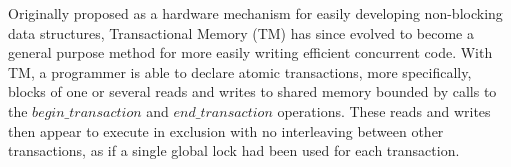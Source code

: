 \documentclass[11pt,letterpaper]{article}
\begin{document}
\newlength {\squarewidth}
\renewenvironment {square}
{
\setlength {\squarewidth} {\linewidth}
\addtolength {\squarewidth} {-12pt}
\renewcommand{\baselinestretch}{0.75} \footnotesize
\begin {center}
\begin {tabular} {|c|} \hline
\begin {minipage} {\squarewidth}
\medskip
}{
\end {minipage}
\\ \hline
\end{tabular}
\end{center}
}  
 
\newtheorem{definition}{Definition}
\newtheorem{theorem}{Theorem}
\newtheorem{lemma}{Lemma}
\newtheorem{corollary}{Corollary}
\newcommand{\toto}{xxx}
\newenvironment{proofT}{\noindent{\bf
Proof }} {\hspace*{\fill}$\Box_{Theorem~\ref{\toto}}$\par\vspace{3mm}}
\newenvironment{proofL}{\noindent{\bf
Proof }} {\hspace*{\fill}$\Box_{Lemma~\ref{\toto}}$\par\vspace{3mm}}
\newenvironment{proofC}{\noindent{\bf
Proof }} {\hspace*{\fill}$\Box_{Corollary~\ref{\toto}}$\par\vspace{3mm}}


\newcommand{\linenumbering}{\ifthenelse{\value{linecounter}<10}
{(0\arabic{linecounter})}{(\arabic{linecounter})}}
\renewcommand{\line}[1]{\refstepcounter{linecounter}\label{#1}\linenumbering}
\newcommand{\resetline}[1]{\setcounter{linecounter}{0}#1}
\renewcommand{\thelinecounter}{\ifnum \value{linecounter} > 
9\else 0\fi \arabic{linecounter}}

\newcommand{\tuple}[1]{\ensuremath{\left \langle #1 \right \rangle }}


Originally proposed as a hardware mechanism for easily developing non-blocking data structures,
Transactional Memory (TM) has since evolved to become a general purpose method for more easily writing
efficient concurrent code.
With TM, a programmer is able to declare atomic transactions, more specifically, blocks
of one or several reads and writes to shared memory bounded by calls to the
$\mathit{begin\_transaction}$ and $\mathit{end\_transaction}$ operations.
These reads and writes then appear to execute in exclusion with no interleaving
between other transactions, as if a single global lock had been used for each transaction.
\end{document}
